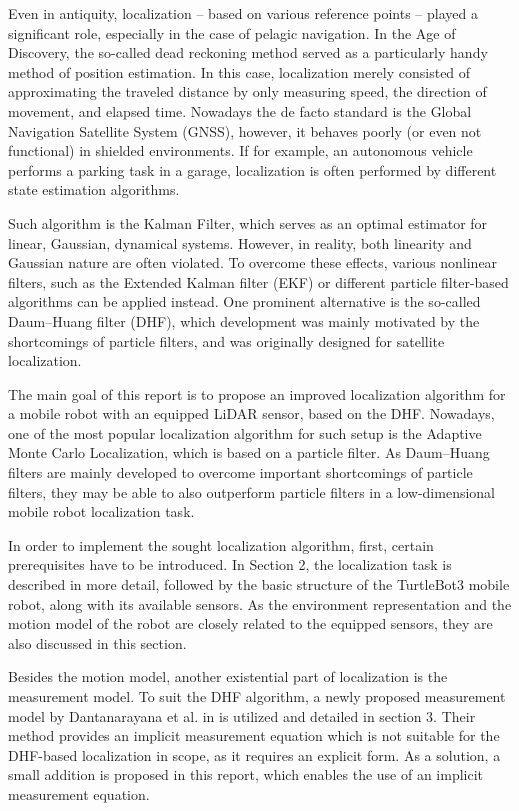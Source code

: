 
Even in antiquity, localization -- based on various reference points -- played a significant role, especially in the case of pelagic navigation. In the Age of Discovery, the so-called dead reckoning method served as a particularly handy method of position estimation. In this case, localization merely consisted of approximating the traveled distance by only measuring speed, the direction of movement, and elapsed time. Nowadays the de facto standard is the Global Navigation Satellite System (GNSS), however, it behaves poorly (or even not functional) in shielded environments. If for example, an autonomous vehicle performs a parking task in a garage, localization is often performed by different state estimation algorithms.

Such algorithm is the Kalman Filter, which serves as an optimal estimator for linear, Gaussian, dynamical systems. However, in reality, both linearity and Gaussian nature are often violated. To overcome these effects, various nonlinear filters, such as the Extended Kalman filter (EKF) or different particle filter-based algorithms can be applied instead. One prominent alternative is the so-called Daum–Huang filter (DHF), which development was mainly motivated by the shortcomings of particle filters, and was originally designed for satellite localization.

The main goal of this report is to propose an improved
localization algorithm for a mobile robot with an
equipped LiDAR sensor, based on the DHF.
Nowadays, one of the most popular localization algorithm
for such setup is the Adaptive Monte Carlo Localization, which is based on a particle filter.
As Daum--Huang filters are mainly developed to overcome important shortcomings of particle
filters, they may be able to also outperform particle filters in a low-dimensional mobile robot
localization task.

In order to implement the sought localization algorithm, first, certain prerequisites
have to be introduced. In Section 2, the localization task is described in more detail,
followed by the basic structure of the TurtleBot3 mobile robot, along with its available sensors.
As the environment representation and the motion model of the robot are closely related to the equipped sensors, they are also discussed in this section.

Besides the motion model, another existential part of localization is the measurement model.
To suit the DHF algorithm, a newly proposed measurement model by Dantanarayana et al. in \cite{Dantanarayana2013} is utilized and detailed in section 3. Their method provides an implicit
measurement equation which is not suitable for the DHF-based localization in scope, as it
requires an explicit form. As a solution, a small addition is proposed in this report,
which enables the use of an implicit measurement equation.

